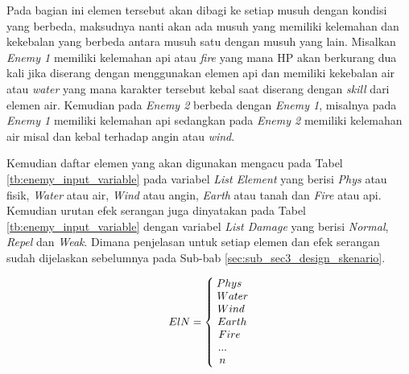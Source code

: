 Pada bagian ini elemen tersebut akan dibagi ke setiap musuh dengan kondisi yang berbeda, maksudnya nanti akan ada musuh yang memiliki kelemahan dan kekebalan yang berbeda antara musuh satu dengan musuh yang lain. Misalkan \textit{Enemy 1} memiliki kelemahan api atau \textit{fire} yang mana HP akan berkurang dua kali jika diserang dengan menggunakan elemen api dan memiliki kekebalan air atau \textit{water} yang mana karakter tersebut kebal saat diserang dengan \textit{skill} dari elemen air. Kemudian pada \textit{Enemy 2} berbeda dengan \textit{Enemy 1}, misalnya pada \textit{Enemy 1} memiliki kelemahan api sedangkan pada \textit{Enemy 2} memiliki kelemahan air misal dan kebal terhadap angin atau \textit{wind}. 
\vspace{1ex}

Kemudian daftar elemen yang akan digunakan mengacu pada Tabel \ref{tb:enemy_input_variable} pada variabel \textit{List Element} yang berisi \textit{Phys} atau fisik, \textit{Water} atau air, \textit{Wind} atau angin, \textit{Earth} atau tanah dan \textit{Fire} atau api. Kemudian urutan efek serangan juga dinyatakan pada Tabel \ref{tb:enemy_input_variable} dengan variabel \textit{List Damage} yang berisi \textit{Normal}, \textit{Repel} dan \textit{Weak}. Dimana penjelasan untuk setiap elemen dan efek serangan sudah dijelaskan sebelumnya pada Sub-bab \ref{sec:sub_sec3_design_skenario}.
\vspace{1ex}

\begin{equation}\label{eq:enemy_element}
\resizebox{0.21\textwidth}{!}{%
	$ElN = \left\{\begin{matrix}
	\hspace{-0.34em} Phys \\ 
	\hspace{0.3em} Water \\
	\hspace{0.0em} Wind \\
	\hspace{0.2em} Earth \\
	\hspace{-0.3em} Fire \\
	\hspace{-1.6em} ... \\
	\hspace{-1.6em} n
	\end{matrix}\right.$%
}
\end{equation}


